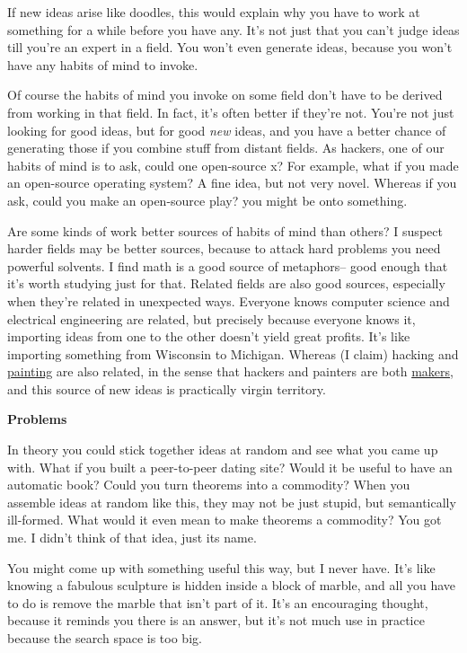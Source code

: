 If new ideas arise like doodles, this would explain why you have to work
at something for a while before you have any. It's not just that you
can't judge ideas till you're an expert in a field. You won't even
generate ideas, because you won't have any habits of mind to invoke.

Of course the habits of mind you invoke on some field don't have to be
derived from working in that field. In fact, it's often better if
they're not. You're not just looking for good ideas, but for good
\emph{new} ideas, and you have a better chance of generating those if
you combine stuff from distant fields. As hackers, one of our habits of
mind is to ask, could one open-source x? For example, what if you made
an open-source operating system? A fine idea, but not very novel.
Whereas if you ask, could you make an open-source play? you might be
onto something.

Are some kinds of work better sources of habits of mind than others? I
suspect harder fields may be better sources, because to attack hard
problems you need powerful solvents. I find math is a good source of
metaphors-- good enough that it's worth studying just for that. Related
fields are also good sources, especially when they're related in
unexpected ways. Everyone knows computer science and electrical
engineering are related, but precisely because everyone knows it,
importing ideas from one to the other doesn't yield great profits. It's
like importing something from Wisconsin to Michigan. Whereas (I claim)
hacking and \href{hp.html}{painting} are also related, in the sense that
hackers and painters are both \href{taste.html}{makers}, and this source
of new ideas is practically virgin territory.

\textbf{Problems}

In theory you could stick together ideas at random and see what you came
up with. What if you built a peer-to-peer dating site? Would it be
useful to have an automatic book? Could you turn theorems into a
commodity? When you assemble ideas at random like this, they may not be
just stupid, but semantically ill-formed. What would it even mean to
make theorems a commodity? You got me. I didn't think of that idea, just
its name.

You might come up with something useful this way, but I never have. It's
like knowing a fabulous sculpture is hidden inside a block of marble,
and all you have to do is remove the marble that isn't part of it. It's
an encouraging thought, because it reminds you there is an answer, but
it's not much use in practice because the search space is too big.


